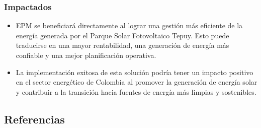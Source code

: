 \documentclass[a4paper]{article}
\begin{document}
\subsubsection{Impactados}

\begin{itemize}
    \item EPM se beneficiará directamente al lograr una gestión más eficiente de la energía generada por el Parque Solar Fotovoltaico Tepuy. Esto puede traducirse en una mayor rentabilidad, una generación de energía más confiable y una mejor planificación operativa.
    \item La implementación exitosa de esta solución podría tener un impacto positivo en el sector energético de Colombia al promover la generación de energía solar y contribuir a la transición hacia fuentes de energía más limpias y sostenibles.    
\end{itemize}

\subsection*{Referencias\label{sec:references}}

\printbibliography[heading=none]
\end{document}
